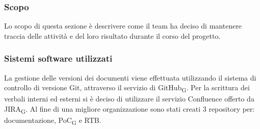 \subsubsection{Scopo}
Lo scopo di questa sezione è descrivere come il team ha deciso di mantenere traccia delle attività e del loro risultato durante il corso del progetto. 

\subsubsection{Sistemi software utilizzati}
La gestione delle versioni dei documenti viene effettuata utilizzando il sistema di controllo di versione Git, attraverso il servizio di GitHub\textsubscript{G}. Per la scrittura dei verbali interni ed esterni si è deciso di utilizzare il servizio Confluence offerto da JIRA\textsubscript{G}.
Al fine di una migliore organizzazione sono stati creati 3 repository per: documentazione, PoC\textsubscript{G} e RTB.
